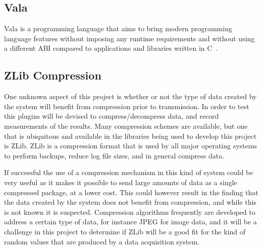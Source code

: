   \subsection{Vala}\label{sec:tech-vala}

    Vala is a programming language that aims to bring modern programming
    language features without imposing any runtime requirements and without
    using a different ABI compared to applications and libraries written in
    C~\cite{Vala2016}.

  \subsection{ZLib Compression}\label{sec:tech-zlib}

    One unknown aspect of this project is whether or not the type of data
    created by the system will benefit from compression prior to transmission.
    In order to test this plugins will be devised to compress/decompress data,
    and record measurements of the results. Many compression schemes are
    available, but one that is ubiquitous and available in the libraries being
    used to develop this project is ZLib. ZLib is a compression format that is
    used by all major operating systems to perform backups, reduce log file
    sizes, and in general compress data.

    If successful the use of a compression mechanism in this kind of system
    could be very useful as it makes it possible to send large amounts of data
    as a single compressed package, at a lower cost. This could however result
    in the finding that the data created by the system does not benefit from
    compression, and while this is not known it is suspected. Compression
    algorithms frequently are developed to address a certain type of data, for
    instance JPEG for image data, and it will be a challenge in this project to
    determine if ZLib will be a good fit for the kind of random values that are
    produced by a data acquisition system.
